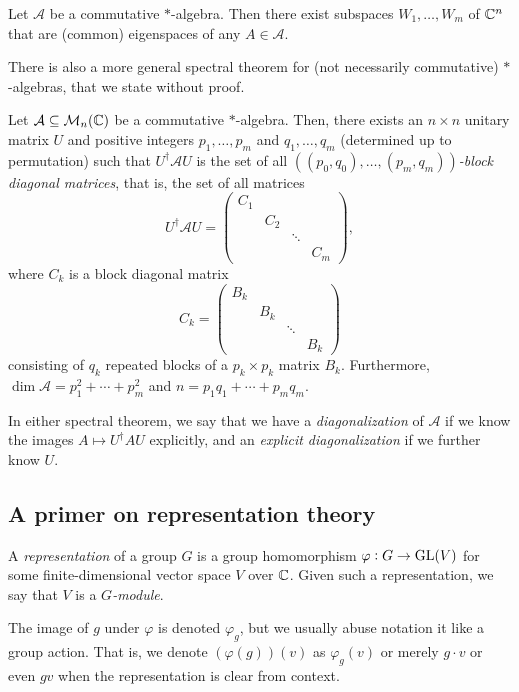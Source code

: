	\begin{corollary}
		Let $\mathcal{A}$ be a commutative $*$-algebra. Then there exist subspaces $W_1,\ldots,W_m$ of $\mathbb{C}^n$ that are (common) eigenspaces of any $A \in \mathcal{A}$.
	\end{corollary}

	There is also a more general spectral theorem for (not necessarily commutative) $*$-algebras, that we state without proof.

	\begin{ftheo}
		\label{theo:noncomm-spec-thm}
		Let $\mathcal{A} \subseteq \mathcal{M}_n(\mathbb{C})$ be a commutative $*$-algebra. Then, there exists an $n \times n$ unitary matrix $U$ and positive integers $p_1,\ldots,p_m$ and $q_1,\ldots,q_m$ (determined up to permutation) such that $U^\dagger \mathcal{A} U$ is the set of all \emph{$((p_0,q_0),\ldots,(p_m,q_m))$-block diagonal matrices}, that is, the set of all matrices
		\[ U^\dagger \mathcal{A} U = \begin{pmatrix} C_1 & & & \\ & C_2 & & \\ & & \ddots & \\ & & & C_m \end{pmatrix}, \]
		where $C_k$ is a block diagonal matrix
		\[ C_k = \begin{pmatrix} B_k & & & \\ & B_k & & \\ & & \ddots & \\ & & & B_k \end{pmatrix} \]
		consisting of $q_k$ repeated blocks of a $p_k \times p_k$ matrix $B_k$.	
		Furthermore, $\dim \mathcal{A} = p_1^2 + \cdots + p_m^2$ and $n = p_1q_1 + \cdots + p_mq_m$.
	\end{ftheo}

	In either spectral theorem, we say that we have a \emph{diagonalization} of $\mathcal{A}$ if we know the images $A \mapsto U^\dagger A U$ explicitly, and an \emph{explicit diagonalization} if we further know $U$.

\subsection{A primer on representation theory}

	\begin{fdef}
		A \emph{representation} of a group $G$ is a group homomorphism $\varphi : G \to \operatorname{GL}(V)$ for some finite-dimensional vector space $V$ over $\mathbb{C}$. Given such a representation, we say that $V$ is a \emph{$G$-module}.
	\end{fdef}
	The image of $g$ under $\varphi$ is denoted $\varphi_g$, but we usually abuse notation it like a group action. That is, we denote $(\varphi(g))(v)$ as $\varphi_g(v)$ or merely $g \cdot v$ or even $gv$ when the representation is clear from context.

